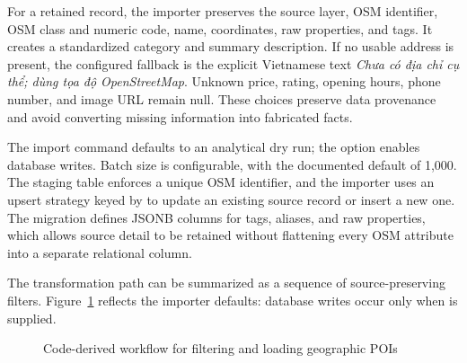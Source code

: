 For a retained record, the importer preserves the source layer, OSM identifier, OSM class and numeric code, name, coordinates, raw properties, and tags. It creates a standardized category and summary description. If no usable address is present, the configured fallback is the explicit Vietnamese text \textit{Chưa có địa chỉ cụ thể; dùng tọa độ OpenStreetMap}. Unknown price, rating, opening hours, phone number, and image URL remain null. These choices preserve data provenance and avoid converting missing information into fabricated facts.

The import command defaults to an analytical dry run; the  option enables database writes. Batch size is configurable, with the documented default of 1,000. The staging table enforces a unique OSM identifier, and the importer uses an upsert strategy keyed by  to update an existing source record or insert a new one. The migration defines JSONB columns for tags, aliases, and raw properties, which allows source detail to be retained without flattening every OSM attribute into a separate relational column.

The transformation path can be summarized as a sequence of source-preserving filters. Figure~\ref{fig:poi_ingestion_pipeline} reflects the importer defaults: database writes occur only when  is supplied.

\begin{figure}[htbp]
    \centering
    \caption{Code-derived workflow for filtering and loading geographic POIs}
    \label{fig:poi_ingestion_pipeline}
\end{figure}

